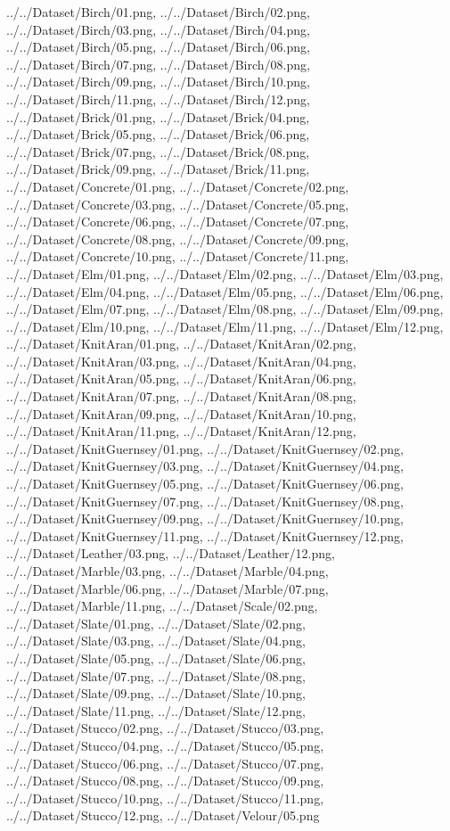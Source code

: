 \documentclass[12pt,a4paper]{article}
\begin{document}
\begin{singlespace}
{../../Dataset/Birch/01.png,
../../Dataset/Birch/02.png,
../../Dataset/Birch/03.png,
../../Dataset/Birch/04.png,
../../Dataset/Birch/05.png,
../../Dataset/Birch/06.png,
../../Dataset/Birch/07.png,
../../Dataset/Birch/08.png,
../../Dataset/Birch/09.png,
../../Dataset/Birch/10.png,
../../Dataset/Birch/11.png,
../../Dataset/Birch/12.png,
../../Dataset/Brick/01.png,
../../Dataset/Brick/04.png,
../../Dataset/Brick/05.png,
../../Dataset/Brick/06.png,
../../Dataset/Brick/07.png,
../../Dataset/Brick/08.png,
../../Dataset/Brick/09.png,
../../Dataset/Brick/11.png,
../../Dataset/Concrete/01.png,
../../Dataset/Concrete/02.png,
../../Dataset/Concrete/03.png,
../../Dataset/Concrete/05.png,
../../Dataset/Concrete/06.png,
../../Dataset/Concrete/07.png,
../../Dataset/Concrete/08.png,
../../Dataset/Concrete/09.png,
../../Dataset/Concrete/10.png,
../../Dataset/Concrete/11.png,
../../Dataset/Elm/01.png,
../../Dataset/Elm/02.png,
../../Dataset/Elm/03.png,
../../Dataset/Elm/04.png,
../../Dataset/Elm/05.png,
../../Dataset/Elm/06.png,
../../Dataset/Elm/07.png,
../../Dataset/Elm/08.png,
../../Dataset/Elm/09.png,
../../Dataset/Elm/10.png,
../../Dataset/Elm/11.png,
../../Dataset/Elm/12.png,
../../Dataset/KnitAran/01.png,
../../Dataset/KnitAran/02.png,
../../Dataset/KnitAran/03.png,
../../Dataset/KnitAran/04.png,
../../Dataset/KnitAran/05.png,
../../Dataset/KnitAran/06.png,
../../Dataset/KnitAran/07.png,
../../Dataset/KnitAran/08.png,
../../Dataset/KnitAran/09.png,
../../Dataset/KnitAran/10.png,
../../Dataset/KnitAran/11.png,
../../Dataset/KnitAran/12.png,
../../Dataset/KnitGuernsey/01.png,
../../Dataset/KnitGuernsey/02.png,
../../Dataset/KnitGuernsey/03.png,
../../Dataset/KnitGuernsey/04.png,
../../Dataset/KnitGuernsey/05.png,
../../Dataset/KnitGuernsey/06.png,
../../Dataset/KnitGuernsey/07.png,
../../Dataset/KnitGuernsey/08.png,
../../Dataset/KnitGuernsey/09.png,
../../Dataset/KnitGuernsey/10.png,
../../Dataset/KnitGuernsey/11.png,
../../Dataset/KnitGuernsey/12.png,
../../Dataset/Leather/03.png,
../../Dataset/Leather/12.png,
../../Dataset/Marble/03.png,
../../Dataset/Marble/04.png,
../../Dataset/Marble/06.png,
../../Dataset/Marble/07.png,
../../Dataset/Marble/11.png,
../../Dataset/Scale/02.png,
../../Dataset/Slate/01.png,
../../Dataset/Slate/02.png,
../../Dataset/Slate/03.png,
../../Dataset/Slate/04.png,
../../Dataset/Slate/05.png,
../../Dataset/Slate/06.png,
../../Dataset/Slate/07.png,
../../Dataset/Slate/08.png,
../../Dataset/Slate/09.png,
../../Dataset/Slate/10.png,
../../Dataset/Slate/11.png,
../../Dataset/Slate/12.png,
../../Dataset/Stucco/02.png,
../../Dataset/Stucco/03.png,
../../Dataset/Stucco/04.png,
../../Dataset/Stucco/05.png,
../../Dataset/Stucco/06.png,
../../Dataset/Stucco/07.png,
../../Dataset/Stucco/08.png,
../../Dataset/Stucco/09.png,
../../Dataset/Stucco/10.png,
../../Dataset/Stucco/11.png,
../../Dataset/Stucco/12.png,
../../Dataset/Velour/05.png}


\end{singlespace}
\end{document}
